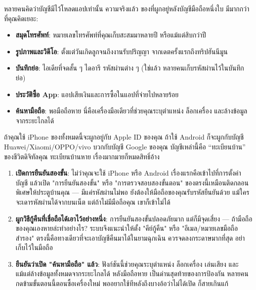 


หลายคนคิดว่าบัญชีมีไว้โหลดแอปเท่านั้น ความจริงแล้ว ของที่ผูกอยู่หลังบัญชีมือถือหนึ่งใบ มีมากกว่าที่คุณคิดเยอะ:

\begin{itemize}
  \item \textbf{สมุดโทรศัพท์}: หมายเลขโทรศัพท์ที่คุณเก็บสะสมมาหลายปี หรือแม้แต่สิบกว่าปี
  \item \textbf{รูปภาพและวิดีโอ}: ตั้งแต่วันเกิดลูกจนถึงงานรับปริญญา จากเดตครั้งแรกถึงทริปฮันนีมูน
  \item \textbf{บันทึกย่อ}: ไอเดียที่จดสั้น ๆ ไดอารี รหัสผ่านต่าง ๆ (ใช่แล้ว หลายคนเก็บรหัสผ่านไว้ในบันทึกย่อ)
  \item \textbf{ประวัติซื้อ App}: แอปเสียเงินและการซื้อในแอปที่จ่ายไปหลายร้อย
  \item \textbf{ค้นหามือถือ}: พอมือถือหาย นี่คือเครื่องมือเดียวที่ช่วยคุณระบุตำแหน่ง ล็อกเครื่อง และล้างข้อมูลจากระยะไกลได้
\end{itemize}

ถ้าคุณใช้ iPhone ของทั้งหมดนี้จะผูกอยู่กับ Apple ID ของคุณ ถ้าใช้ Android ก็จะผูกกับบัญชี Huawei/Xiaomi/OPPO/vivo บวกกับบัญชี Google ของคุณ บัญชีเหล่านี้คือ “ทะเบียนบ้าน” ของชีวิตดิจิทัลคุณ ทะเบียนบ้านหาย เรื่องมากมายก็หมดสิทธิ์อ้าง


\begin{enumerate}
  \item \textbf{เปิดการยืนยันสองขั้น}: ไม่ว่าคุณจะใช้ iPhone หรือ Android เรื่องแรกคือเข้าไปที่การตั้งค่าบัญชี แล้วเปิด "การยืนยันสองขั้น" หรือ "การตรวจสอบสองขั้นตอน" ของตรงนี้เหมือนติดกลอนพิเศษให้ประตูบ้านคุณ — มีแค่รหัสผ่านไม่พอ ยังต้องให้มือถือของคุณรับรหัสยืนยันด้วย แม้ใครจะเดารหัสผ่านได้จากบนเน็ต แต่ถ้าไม่มีมือถือคุณ เขาก็เข้าไม่ได้
  \item \textbf{ผูกวิธีกู้คืนที่เชื่อถือได้เอาไว้อย่างหนึ่ง}: การยืนยันสองขั้นปลอดภัยมาก แต่ก็มีจุดเสี่ยง — ถ้ามือถือของคุณเองหายล่ะทำอย่างไร? ระบบจึงแนะนำให้ตั้ง "คีย์กู้คืน" หรือ "อีเมล/หมายเลขมือถือสำรอง" ตรงนี้คือทางเดียวที่จะเอาบัญชีคืนมาได้ในยามฉุกเฉิน ควรจดลงกระดาษมากที่สุด อย่าเก็บไว้ในมือถือ
  \item \textbf{ยืนยันว่าเปิด "ค้นหามือถือ" แล้ว}: ฟังก์ชันนี้ช่วยคุณระบุตำแหน่ง ล็อกเครื่อง เล่นเสียง และแม้แต่ล้างข้อมูลทั้งหมดจากระยะไกลได้ หลังมือถือหาย เป็นด่านสุดท้ายของการป้องกัน หลายคนกดข้ามขั้นตอนนี้ตอนซื้อเครื่องใหม่ พออยากใช้ทีหลังถึงบางอ้อว่าไม่ได้เปิด ก็สายเกินแก้
\end{enumerate}

